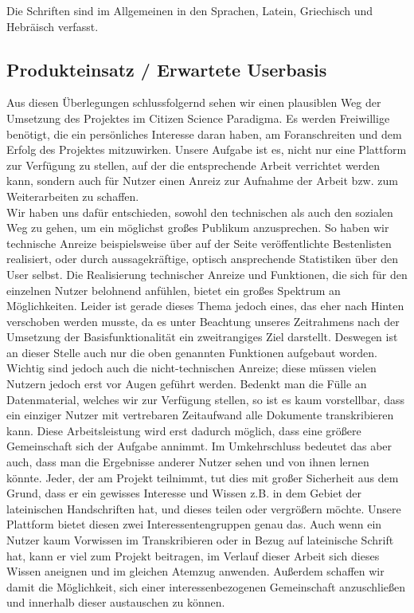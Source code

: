 \documentclass{article}
\begin{document}
Die Schriften sind im Allgemeinen in den Sprachen, Latein, Griechisch und Hebräisch verfasst.

\subsection{Produkteinsatz / Erwartete Userbasis}
Aus diesen Überlegungen schlussfolgernd sehen wir einen plausiblen Weg der Umsetzung des Projektes im Citizen Science Paradigma.
Es werden Freiwillige benötigt, die ein persönliches Interesse daran haben, am Foranschreiten und dem Erfolg des Projektes mitzuwirken.
Unsere Aufgabe ist es, nicht nur eine Plattform zur Verfügung zu stellen, auf der die entsprechende Arbeit verrichtet werden kann,
sondern auch für Nutzer einen Anreiz zur Aufnahme der Arbeit bzw. zum Weiterarbeiten zu schaffen.\\
Wir haben uns dafür entschieden, sowohl den technischen als auch den sozialen Weg zu gehen, um ein möglichst großes Publikum anzusprechen.
So haben wir technische Anreize beispielsweise über auf der Seite veröffentlichte Bestenlisten realisiert, oder durch aussagekräftige,
optisch ansprechende Statistiken über den User selbst. Die Realisierung technischer Anreize und Funktionen,
die sich für den einzelnen Nutzer belohnend anfühlen, bietet ein großes Spektrum an Möglichkeiten.
Leider ist gerade dieses Thema jedoch eines, das eher nach Hinten verschoben werden musste,
da es unter Beachtung unseres Zeitrahmens nach der Umsetzung der Basisfunktionalität ein zweitrangiges Ziel darstellt.
Deswegen ist an dieser Stelle auch nur die oben genannten Funktionen aufgebaut worden.\\
Wichtig sind jedoch auch die nicht-technischen Anreize; diese müssen vielen Nutzern jedoch erst vor Augen geführt werden.
Bedenkt man die Fülle an Datenmaterial, welches wir zur Verfügung stellen, so ist es kaum vorstellbar,
dass ein einziger Nutzer mit vertrebaren Zeitaufwand alle Dokumente transkribieren kann.
Diese Arbeitsleistung wird erst dadurch möglich, dass eine größere Gemeinschaft sich der Aufgabe annimmt.
Im Umkehrschluss bedeutet das aber auch, dass man die Ergebnisse anderer Nutzer sehen und von ihnen lernen könnte.
Jeder, der am Projekt teilnimmt, tut dies mit großer Sicherheit aus dem Grund,
dass er ein gewisses Interesse und Wissen z.B. in dem Gebiet der lateinischen Handschriften hat, und dieses teilen oder vergrößern möchte.
Unsere Plattform bietet diesen zwei Interessentengruppen genau das.
Auch wenn ein Nutzer kaum Vorwissen im Transkribieren oder in Bezug auf lateinische Schrift hat, kann er viel zum Projekt beitragen,
im Verlauf dieser Arbeit sich dieses Wissen aneignen und im gleichen Atemzug anwenden.
Außerdem schaffen wir damit die Möglichkeit, sich einer interessenbezogenen Gemeinschaft anzuschließen und innerhalb dieser austauschen zu können.
\end{document}
